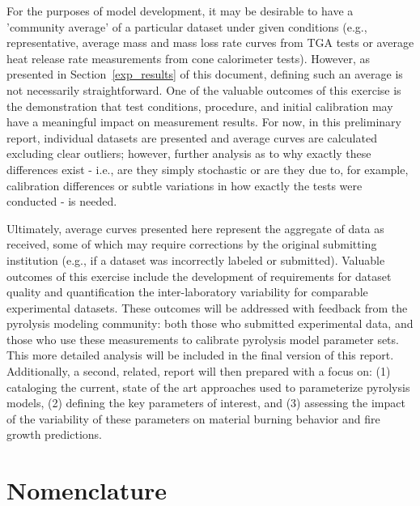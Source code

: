 \documentclass{book}
\begin{document}
For the purposes of model development, it may be desirable to have a 'community average' of a particular dataset under given conditions (e.g., representative, average mass and mass loss rate curves from TGA tests or average heat release rate measurements from cone calorimeter tests). However, as presented in Section~\ref{exp_results} of this document, defining such an average is not necessarily straightforward. One of the valuable outcomes of this exercise is the demonstration that test conditions, procedure, and initial calibration may have a meaningful impact on measurement results. For now, in this preliminary report, individual datasets are presented and average curves are calculated excluding clear outliers; however, further analysis as to why exactly these differences exist - i.e., are they simply stochastic or are they due to, for example, calibration differences or subtle variations in how exactly the tests were conducted - is needed. 

Ultimately, average curves presented here represent the aggregate of data as received, some of which may require corrections by the original submitting institution (e.g., if a dataset was incorrectly labeled or submitted). Valuable outcomes of this exercise include the development of requirements for dataset quality and quantification the inter-laboratory variability for comparable experimental datasets. These outcomes will be addressed with feedback from the pyrolysis modeling community: both those who submitted experimental data, and those who use these measurements to calibrate pyrolysis model parameter sets. This more detailed analysis will be included in the final version of this report. Additionally, a second, related, report will then prepared with a focus on: (1) cataloging the current, state of the art approaches used to parameterize pyrolysis models, (2) defining the key parameters of interest, and (3) assessing the impact of the variability of these parameters on material burning behavior and fire growth predictions.

\backmatter


\chapter{Nomenclature}
\label{nomenclature}
\end{document}
